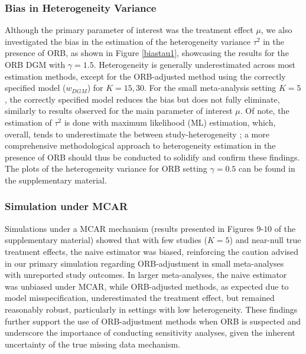 \documentclass[twocolumn]{article}\usepackage[]{graphicx}\usepackage[]{xcolor}
\begin{document}
\subsubsection{Bias in Heterogeneity Variance}

Although the primary parameter of interest was the treatment effect $\mu$, we also investigated the bias in the estimation of the heterogeneity variance $\tau^2$ in the presence of ORB, as shown in Figure \ref{biastau1}, showcasing the results for the ORB DGM with $\gamma=1.5$. Heterogeneity is generally underestimated across most estimation methods, except for the ORB-adjusted method using the correctly specified model ($w_{DGM}$) for $K=15,30$. For the small meta-analysis setting $K=5$, the correctly specified model reduces the bias but does not fully eliminate, similarly to results observed for the main parameter of interest $\mu$. Of note, the estimation of $\tau^2$ is done with maximum likelihood (ML) estimation, which, overall, tends to underestimate the between study-heterogeneity \citep{REML2, REML}; a more comprehensive methodological approach to heterogeneity estimation in the presence of ORB should thus be conducted to solidify and confirm these findings. The plots of the heterogeneity variance for ORB setting $\gamma=0.5$ can be found in the supplementary material.

\subsubsection{Simulation under MCAR} \label{mcar}

Simulations under a MCAR mechanism (results presented in Figures $9$-$10$ of the supplementary material) showed that with few studies ($K = 5$) and near-null true treatment effects, the naive estimator was biased, reinforcing the caution advised in our primary simulation regarding ORB-adjustment in small meta-analyses with unreported study outcomes. In larger meta-analyses, the naive estimator was unbiased under MCAR, while ORB-adjusted methods, as expected due to model misspecification, underestimated the treatment effect, but remained reasonably robust, particularly in settings with low heterogeneity. These findings further support the use of ORB-adjustment methods when ORB is suspected and underscore the importance of conducting sensitivity analyses, given the inherent uncertainty of the true missing data mechanism.
\end{document}
